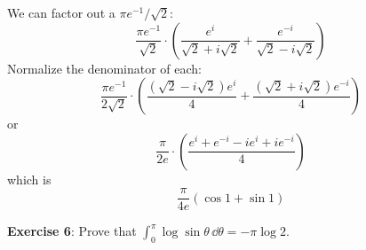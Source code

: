 \documentclass{article}
\begin{document}
\begin{answer}
\begin{equation*}
            \end{equation*}
        We can factor out a $\pi e^{-1}/ \sqrt{2}$:
            \begin{equation*}
                \dfrac{\pi e^{-1}}{\sqrt{2}} \cdot \left(\dfrac{e^{i}}{\sqrt{2} + i\sqrt{2}} + \dfrac{e^{-i}}{\sqrt{2} - i\sqrt{2}}\right)
            \end{equation*}
        Normalize the denominator of each:
            \begin{equation*}
                \dfrac{\pi e^{-1}}{2\sqrt{2}} \cdot \left(\dfrac{(\sqrt{2} - i\sqrt{2})e^{i}}{4} + \dfrac{(\sqrt{2} + i\sqrt{2})e^{-i}}{4}\right)
            \end{equation*}
        or
            \begin{equation*}
                \dfrac{\pi}{2e} \cdot \left(\dfrac{e^{i} + e^{-i} - ie^{i} + ie^{-i}}{4}\right)
            \end{equation*}
        which is
            \begin{equation*}
                \dfrac{\pi}{4e} (\cos{1} + \sin{1})
            \end{equation*}
    \end{answer}

\newpage

\textbf{Exercise 6}: Prove that $\int_{0}^{\pi} \log{\sin{\theta}} \, \dd{\theta} = -\pi \log{2}$.

\newpage
\end{document}
